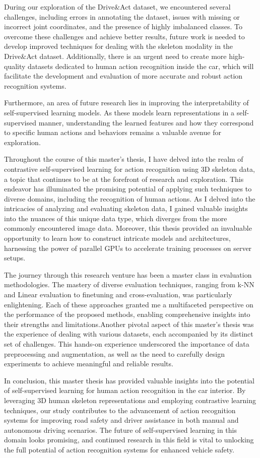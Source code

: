 During our exploration of the Drive\&Act dataset, we encountered several challenges, including errors in annotating the dataset, issues with missing or incorrect joint coordinates, and the presence of highly imbalanced classes. To overcome these challenges and achieve better results, future work is needed to develop improved techniques for dealing with the skeleton modality in the Drive\&Act dataset. Additionally, there is an urgent need to create more high-quality datasets dedicated to human action recognition inside the car, which will facilitate the development and evaluation of more accurate and robust action recognition systems.

Furthermore, an area of future research lies in improving the interpretability of self-supervised learning models. As these models learn representations in a self-supervised manner, understanding the learned features and how they correspond to specific human actions and behaviors remains a valuable avenue for exploration.

Throughout the course of this master's thesis, I have delved into the realm of contrastive self-supervised learning for action recognition using 3D skeleton data, a topic that continues to be at the forefront of research and exploration. This endeavor has illuminated the promising potential of applying such techniques to diverse domains, including the recognition of human actions. As I delved into the intricacies of analyzing and evaluating skeleton data, I gained valuable insights into the nuances of this unique data type, which diverges from the more commonly encountered image data. Moreover, this thesis provided an invaluable opportunity to learn how to construct intricate models and architectures, harnessing the power of parallel GPUs to accelerate training processes on server setups.

The journey through this research venture has been a master class in evaluation methodologies. The mastery of diverse evaluation techniques, ranging from k-NN and Linear evaluation to finetuning and cross-evaluation, was particularly enlightening. Each of these approaches granted me a multifaceted perspective on the performance of the proposed methods, enabling comprehensive insights into their strengths and limitations.Another pivotal aspect of this master's thesis was the experience of dealing with various datasets, each accompanied by its distinct set of challenges. This hands-on experience underscored the importance of data preprocessing and augmentation, as well as the need to carefully design experiments to achieve meaningful and reliable results. 


In conclusion, this master thesis has provided valuable insights into the potential of self-supervised learning for human action recognition in the car interior. By leveraging 3D human skeleton representations and employing contrastive learning techniques, our study contributes to the advancement of action recognition systems for improving road safety and driver assistance in both manual and autonomous driving scenarios. The future of self-supervised learning in this domain looks promising, and continued research in this field is vital to unlocking the full potential of action recognition systems for enhanced vehicle safety.
